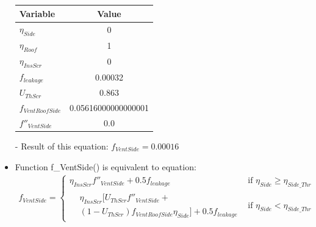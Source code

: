 \documentclass[a4paper]{article}
\begin{document}
\begin{itemize}
        \begin{table}[H]
          \centering
          \begin{tabular}{@{}lS[table-format=1.17]@{}}
            \toprule
            \textbf{Variable}    & \textbf{Value}      \\
            \midrule
            \(\eta_{Side}\)      & 0                   \\
            \(\eta_{Roof}\)      & 1                   \\
            \(\eta_{InsScr}\)    & 0                   \\
            \(f_{leakage}\)      & 0.00032             \\
            \(U_{ThScr}\)        & 0.863               \\
            \(f_{VentRoofSide}\) & 0.05616000000000001 \\
            \(f''_{VentSide}\)   & 0.0                 \\
            \bottomrule
          \end{tabular}
        \end{table}

  \item[-] Result of this equation: \(f_{VentSide} = 0.00016\)

  \item Function f\_VentSide() is equivalent to equation:
        \begin{gather*}
          f_{VentSide} =
          \begin{cases}
            \eta_{InsScr} f''_{VentSide} + 0.5f_{leakage} & \text{if~} \eta_{Side} \geq \eta_{Side\_Thr} \\
            \begin{split}
              & \eta_{InsScr} [U_{ThScr}f''_{VentSide} + \\
              & (1-U_{ThScr})f_{VentRoofSide} \eta_{Side}] + 0.5 f_{leakage}
            \end{split}                   & \text{if~} \eta_{Side} < \eta_{Side\_Thr}
          \end{cases}
        \end{gather*}


\end{itemize}
\end{document}

